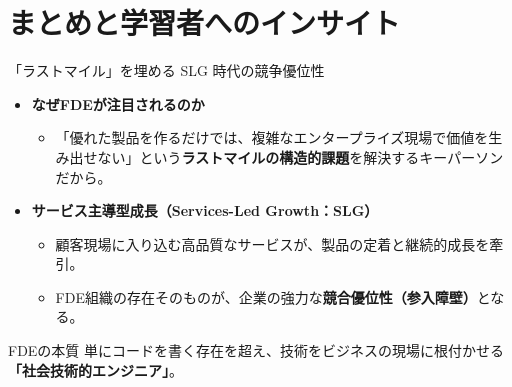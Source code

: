 \documentclass[aspectratio=169,11pt]{beamer}
\begin{document}
\section{まとめと学習者へのインサイト}

\begin{frame}{「ラストマイル」を埋める SLG 時代の競争優位性}
  \begin{itemize}
    \item \textbf{なぜFDEが注目されるのか}
      \begin{itemize}
        \item 「優れた製品を作るだけでは、複雑なエンタープライズ現場で価値を生み出せない」という\textbf{ラストマイルの構造的課題}を解決するキーパーソンだから。
      \end{itemize}
    \vspace{0.5em}
    \item \textbf{サービス主導型成長（Services-Led Growth：SLG）}
      \begin{itemize}
        \item 顧客現場に入り込む高品質なサービスが、製品の定着と継続的成長を牽引。
        \item FDE組織の存在そのものが、企業の強力な\textbf{競合優位性（参入障壁）}となる。
      \end{itemize}
  \end{itemize}

  \vspace{0.5em}
  \begin{block}{FDEの本質}
    単にコードを書く存在を超え、技術をビジネスの現場に根付かせる\textbf{「社会技術的エンジニア」}。
  \end{block}
\end{frame}
\end{document}

